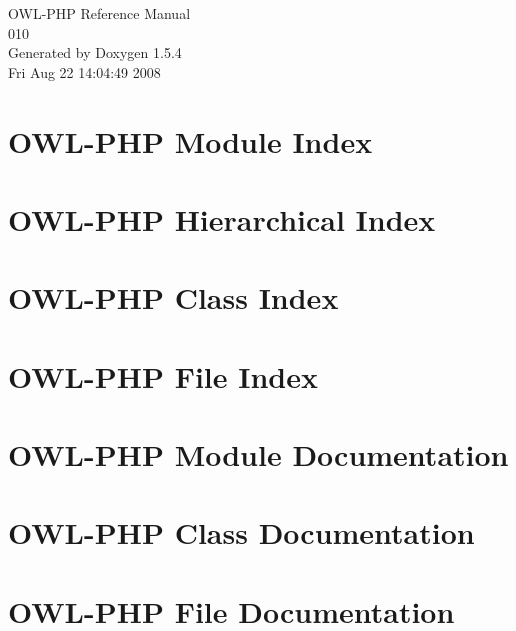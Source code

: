 \documentclass[a4paper]{book}
\begin{document}
\begin{titlepage}
\vspace*{7cm}
\begin{center}
{\Large OWL-PHP Reference Manual\\[1ex]\large 010 }\\
\vspace*{1cm}
{\large Generated by Doxygen 1.5.4}\\
\vspace*{0.5cm}
{\small Fri Aug 22 14:04:49 2008}\\
\end{center}
\end{titlepage}
\clearemptydoublepage
{}
\tableofcontents
\clearemptydoublepage
{}
\chapter{OWL-PHP Module Index}

\chapter{OWL-PHP Hierarchical Index}

\chapter{OWL-PHP Class Index}

\chapter{OWL-PHP File Index}

\chapter{OWL-PHP Module Documentation}




\chapter{OWL-PHP Class Documentation}












\chapter{OWL-PHP File Documentation}

















\printindex
\end{document}
